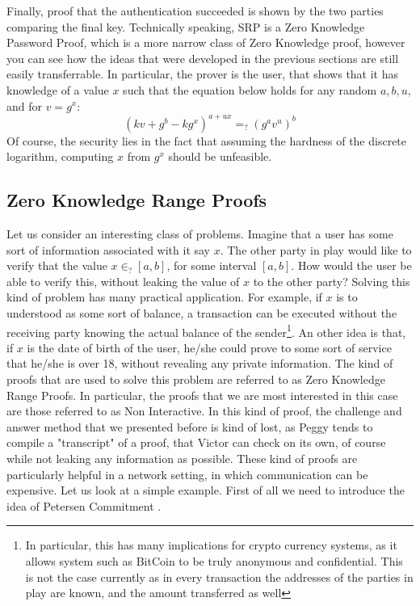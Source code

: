 \documentclass{article}
\begin{document}
Finally, proof that the authentication succeeded is shown by the two parties comparing the final key.
Technically speaking, SRP is a Zero Knowledge Password Proof, which is a more narrow class of Zero Knowledge proof,
however you can see how the ideas that were developed in the previous sections are still easily transferrable.
In particular, the prover is the user, that shows that it has knowledge of a value $x$ such that the equation 
below holds for any random $a, b, u$, and for $v = g^x$:
\[ (kv + g^b - kg^x)^{a + ux} =_? (g^a v^u)^b \]
Of course, the security lies in the fact that assuming the hardness of the discrete logarithm, computing 
$x$ from $g^x$ should be unfeasible.
\subsection{Zero Knowledge Range Proofs}
Let us consider an interesting class of problems. Imagine that a user has some sort of information associated
with it say $x$. The other party in play would like to verify that the value $x \in_? [a, b]$, for some 
interval $[a, b]$. How would the user be able to verify this, without leaking the value of $x$ to the 
other party? Solving this kind of problem has many practical application. For example, if $x$ is to 
understood as some sort of balance, a transaction can be executed without the receiving party knowing the 
actual balance of the sender\footnote{In particular, this has many implications for crypto currency systems,
as it allows system such as BitCoin to be truly anonymous and confidential. This is not the case currently
as in every transaction the addresses of the parties in play are known, and the amount transferred as well}.
An other idea is that, if $x$ is the date of birth of the user, he/she could 
prove to some sort of service that he/she is over 18, without revealing any private information. The kind 
of proofs that are used to solve this problem are referred to as Zero Knowledge Range Proofs. In particular,
the proofs that we are most interested in this case are those referred to as Non Interactive. In this kind 
of proof, the challenge and answer method that we presented before is kind of lost, as Peggy tends to 
compile a "transcript" of a proof, that Victor can check on its own, of course while not leaking any information 
as possible. These kind of proofs are particularly helpful in a network setting, in which communication can 
be expensive. Let us look at a simple example. First of all we need to introduce the idea of Petersen Commitment \cite{pedersenNonInteractiveInformationTheoreticSecure1992}.
\end{document}
